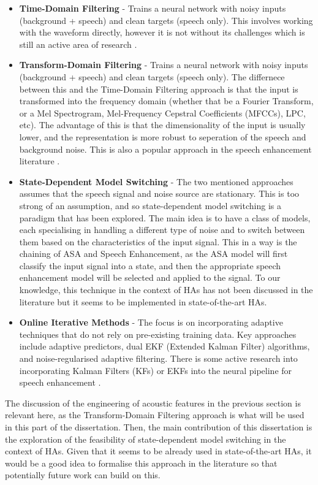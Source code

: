 \documentclass[logo,bsc,singlespacing,parskip,online]{infthesis}
\begin{document}
\begin{itemize}
   \item \textbf{Time-Domain Filtering} - Trains a neural network with noisy inputs (background + speech) and clean targets (speech only). 
   This involves working with the waveform directly, however it is not without its challenges which is still an active area of research \citep{saleem_time_2024}.
   \item \textbf{Transform-Domain Filtering} - Trains a neural network with noisy inputs (background + speech) and clean targets (speech only). 
   The differnece between this and the Time-Domain Filtering approach is that the input is transformed into the frequency domain 
   (whether that be a Fourier Transform, or a Mel Spectrogram, Mel-Frequency Cepstral Coefficients (MFCCs), LPC, etc). The advantage of this 
   is that the dimensionality of the input is usually lower, and the representation is more robust to seperation of the speech and background noise.
   This is also a popular approach in the speech enhancement literature \citep{tan18_interspeech,hou_local_2023}.
   \item \textbf{State-Dependent Model Switching} - The two mentioned approaches assumes that the speech signal and noise source are stationary. 
   This is too strong of an assumption, and so state-dependent model switching is a paradigm that has been explored. The main idea is 
   to have a class of models, each specialising in handling a different type of noise and to switch between them based on the 
   characteristics of the input signal. This in a way is the chaining of ASA and Speech Enhancement, as the ASA model will 
   first classify the input signal into a state, and then the appropriate speech enhancement model will be selected and applied to the signal.
   To our knowledge, this technique in the context of HAs has not been discussed in the literature but it 
   seems to be implemented in state-of-the-art HAs. 
   \item \textbf{Online Iterative Methods} - The focus is on incorporating adaptive techniques that do not rely on pre-existing 
   training data. Key approaches include adaptive predictors, dual EKF (Extended Kalman Filter) algorithms, and noise-regularised adaptive filtering.
   There is some active research into incorporating Kalman Filters (KFs) or EKFs into the neural pipeline for speech enhancement \citep{Xue2020NeuralKF, Mellahi2023SpeechEU}.
\end{itemize}
The discussion of the engineering of acoustic features in the previous section is relevant here, as the Transform-Domain Filtering approach
is what will be used in this part of the dissertation. 
Then, the main contribution of this dissertation is the exploration of 
the feasibility of state-dependent model switching in the context of HAs. 
Given that it seems to be already used in state-of-the-art HAs, it 
would be a good idea to formalise this approach in the literature 
so that potentially future work can build on this.
\end{document}
